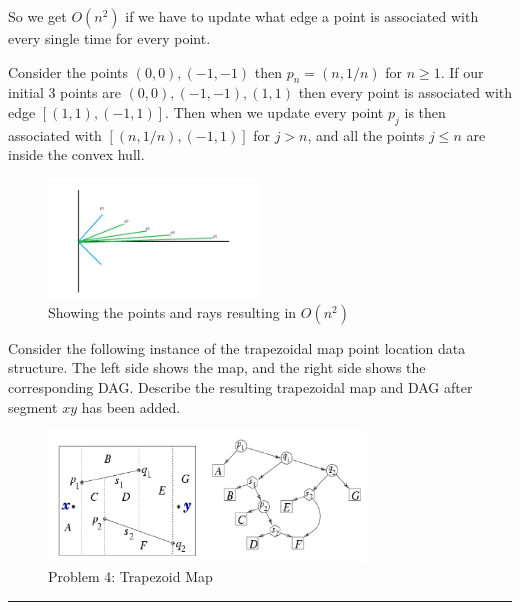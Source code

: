 \documentclass[11pt]{article}
\begin{document}
So we get $O(n^2)$ if we have to update what edge a point is associated with every single time
for every point. 

Consider the points $(0,0), (-1, -1)$ then $p_n = (n, 1/n)$ for $n \geq 1$.
If our initial 3 points are $(0,0),(-1,-1),(1,1)$ then every point is associated with
edge $[(1,1), (-1,1)]$. Then when we update every point $p_j$ is then associated with $[(n,1/n), (-1,1)]$
for $j > n$, and all the points $j \leq n$ are inside the convex hull. 


\begin{figure}[h]
    \centering
    \includegraphics[width=0.5\textwidth]{bad}
    \caption{Showing the points and rays resulting in $O(n^2)$}
\end{figure}














Consider the following instance of the trapezoidal map point location data
structure. The left side shows the map, and the right side shows the
corresponding DAG. Describe the resulting trapezoidal map and DAG after segment
$xy$ has been added.

\begin{figure}[h]
    \centering
    \includegraphics[width=0.75\textwidth]{trapMap}
    \caption{Problem 4: Trapezoid Map}
\end{figure}
\hrule
\end{document}
